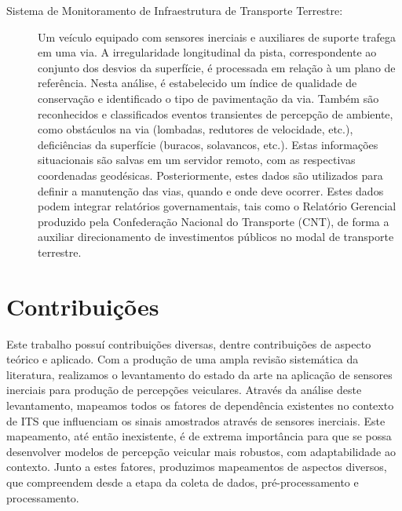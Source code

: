 \begin{description}
\item [Sistema de Monitoramento de Infraestrutura de Transporte Terrestre:] Um veículo equipado com sensores inerciais e auxiliares de suporte trafega em uma via. A irregularidade longitudinal da pista, correspondente ao conjunto dos desvios da superfície, é processada em relação à um plano de referência. Nesta análise, é estabelecido um índice de qualidade de conservação e identificado o tipo de pavimentação da via. Também são reconhecidos e classificados eventos transientes de percepção de ambiente, como obstáculos na via (lombadas, redutores de velocidade, etc.), deficiências da superfície (buracos, solavancos, etc.). Estas informações situacionais são salvas em um servidor remoto, com as respectivas coordenadas geodésicas. Posteriormente, estes dados são utilizados para definir a manutenção das vias, quando e onde deve ocorrer. Estes dados podem integrar relatórios governamentais, tais como o Relatório Gerencial produzido pela Confederação Nacional do Transporte (CNT), de forma a auxiliar direcionamento de investimentos públicos no modal de transporte terrestre.

\end{description}

\section{Contribuições}

Este trabalho possuí contribuições diversas, dentre contribuições de aspecto teórico e aplicado. Com a produção de uma ampla revisão sistemática da literatura, realizamos o levantamento do estado da arte na aplicação de sensores inerciais para produção de percepções veiculares. Através da análise deste levantamento, mapeamos todos os fatores de dependência existentes no contexto de ITS que influenciam os sinais amostrados através de sensores inerciais. Este mapeamento, até então inexistente, é de extrema importância para que se possa desenvolver modelos de percepção veicular mais robustos, com adaptabilidade ao contexto. Junto a estes fatores, produzimos mapeamentos de aspectos diversos, que compreendem desde a etapa da coleta de dados, pré-processamento e processamento.

